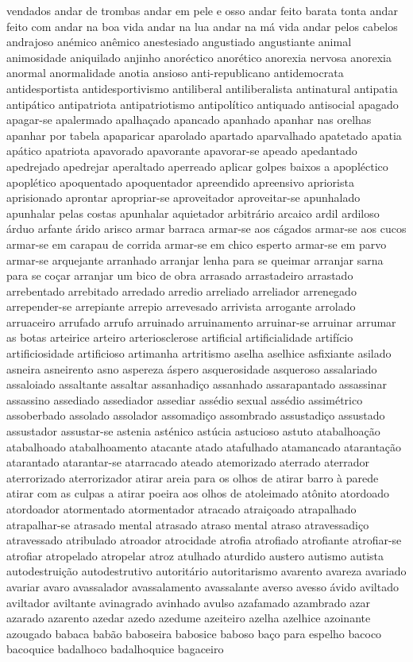 \begin{appendices}
vendados andar de trombas andar em pele e osso andar feito barata tonta andar feito com andar na boa vida andar na lua andar na m\'{a} vida andar pelos cabelos andrajoso an\'{e}mico an\^{e}mico anestesiado angustiado angustiante animal animosidade aniquilado anjinho anor\'{e}ctico anor\'{e}tico anorexia nervosa anorexia anormal anormalidade anotia ansioso anti-republicano antidemocrata antidesportista antidesportivismo antiliberal antiliberalista antinatural antipatia antip\'{a}tico antipatriota antipatriotismo antipol\'{i}tico antiquado antisocial apagado apagar-se apalermado apalha\c{c}ado apancado apanhado apanhar nas orelhas apanhar por tabela apaparicar aparolado apartado aparvalhado apatetado apatia ap\'{a}tico apatriota apavorado apavorante apavorar-se apeado apedantado apedrejado apedrejar aperaltado aperreado aplicar golpes baixos a apopl\'{e}ctico apopl\'{e}tico apoquentado apoquentador apreendido apreensivo apriorista aprisionado aprontar apropriar-se aproveitador aproveitar-se apunhalado apunhalar pelas costas apunhalar aquietador arbitr\'{a}rio arcaico ardil ardiloso \'{a}rduo arfante \'{a}rido arisco armar barraca armar-se aos c\'{a}gados armar-se aos cucos armar-se em carapau de corrida armar-se em chico esperto armar-se em parvo armar-se arquejante arranhado arranjar lenha para se queimar arranjar sarna para se co\c{c}ar arranjar um bico de obra arrasado arrastadeiro arrastado arrebentado arrebitado arredado arredio arreliado arreliador arrenegado arrepender-se arrepiante arrepio arrevesado arrivista arrogante arrolado arruaceiro arrufado arrufo arruinado arruinamento arruinar-se arruinar arrumar as botas arteirice arteiro arteriosclerose artificial artificialidade artif\'{i}cio artificiosidade artificioso artimanha artritismo aselha aselhice asfixiante asilado asneira asneirento asno aspereza \'{a}spero asquerosidade asqueroso assalariado assaloiado assaltante assaltar assanhadi\c{c}o assanhado assarapantado assassinar assassino assediado assediador assediar ass\'{e}dio sexual ass\'{e}dio assim\'{e}trico assoberbado assolado assolador assomadi\c{c}o assombrado assustadi\c{c}o assustado assustador assustar-se astenia ast\'{e}nico ast\'{u}cia astucioso astuto atabalhoa\c{c}\~ao atabalhoado atabalhoamento atacante atado atafulhado atamancado ataranta\c{c}\~ao atarantado atarantar-se atarracado ateado atemorizado aterrado aterrador aterrorizado aterrorizador atirar areia para os olhos de atirar barro \`{a} parede atirar com as culpas a atirar poeira aos olhos de atoleimado at\^{o}nito atordoado atordoador atormentado atormentador atracado atrai\c{c}oado atrapalhado atrapalhar-se atrasado mental atrasado atraso mental atraso atravessadi\c{c}o atravessado atribulado atroador atrocidade atrofia atrofiado atrofiante atrofiar-se atrofiar atropelado atropelar atroz atulhado aturdido austero autismo autista autodestrui\c{c}\~ao autodestrutivo autorit\'{a}rio autoritarismo avarento avareza avariado avariar avaro avassalador avassalamento avassalante averso avesso \'{a}vido aviltado aviltador aviltante avinagrado avinhado avulso azafamado azambrado azar azarado azarento azedar azedo azedume azeiteiro azelha azelhice azoinante azougado babaca bab\~ao baboseira babosice baboso ba\c{c}o para espelho bacoco bacoquice badalhoco badalhoquice bagaceiro 
\end{appendices}
